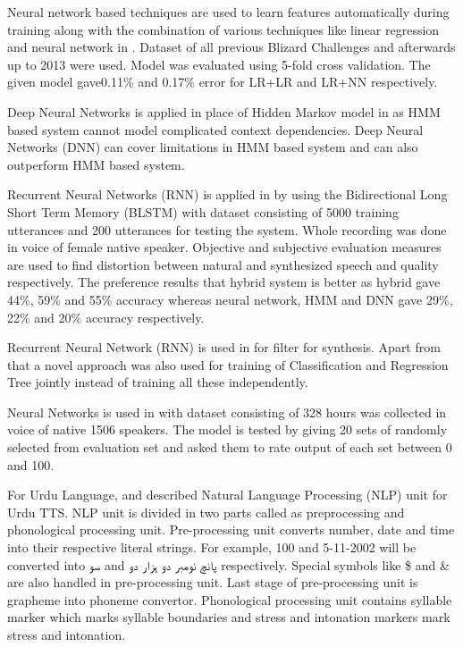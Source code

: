 Neural network based techniques are used to learn features automatically during training along with the combination of various techniques 
like linear regression and neural network in \cite{yoshimura2016hierarchical}. Dataset of all previous Blizard Challenges \cite{blizzard_2009_corpus} and
afterwards up to 2013 were used. Model was evaluated using 5-fold cross validation. The given model gave0.11\% and 0.17\% error for LR+LR and LR+NN 
respectively.

Deep Neural Networks is applied in place of Hidden Markov model in \cite{ze2013statistical} as HMM
based system cannot model complicated context dependencies. Deep Neural Networks (DNN) can
cover limitations in HMM based system and can also outperform HMM based system. 

Recurrent Neural Networks (RNN) is applied in \cite{fan2014tts} by using the Bidirectional Long
Short Term Memory (BLSTM) with dataset consisting of 5000 training utterances and 200
utterances for testing the system. Whole recording was done in voice of female native speaker.
Objective and subjective evaluation measures are used to find distortion between natural and
synthesized speech and quality respectively. The preference results that hybrid system is better as
hybrid gave 44\%, 59\% and 55\% accuracy whereas neural network, HMM and DNN gave 29\%,
22\% and 20\% accuracy respectively.


Recurrent Neural Network (RNN) is used in \cite{muthukumar2016recurrent} for filter for
synthesis. Apart from that a novel approach was also used for training of Classification and
Regression Tree jointly instead of training all these independently.


Neural Networks is used in \cite{wu2016merlin} with dataset consisting of 328 hours was collected in
voice of native 1506 speakers. The model is tested by giving 20 sets of randomly selected from
evaluation set and asked them to rate output of each set between 0 and 100.


For Urdu Language, \cite{saleem2002urdu} and \cite{urdu_text_preprocessing} described Natural
Language Processing (NLP) unit for Urdu TTS. NLP unit is divided in two parts called as preprocessing and phonological processing unit. Pre-processing unit converts number, date and time
into their respective literal strings. For example, 100 and 5-11-2002 will be converted into \texturdu{سو} and \texturdu{پانچ نومبر دو ہزار دو} respectively. Special symbols like \$ and & are also handled in pre-processing unit. Last stage of pre-processing unit is grapheme into phoneme convertor. Phonological
processing unit contains syllable marker which marks syllable boundaries and stress and
intonation markers mark stress and intonation.


